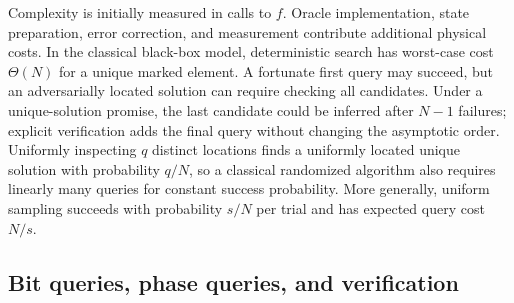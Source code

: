 \documentclass[11pt,oneside,openany]{book}
\theoremstyle{definition}
\begin{document}
Complexity is initially measured in calls to $f$. Oracle implementation, state preparation, error correction, and measurement contribute additional physical costs. In the classical black-box model, deterministic search has worst-case cost $\Theta(N)$ for a unique marked element. A fortunate first query may succeed, but an adversarially located solution can require checking all candidates. Under a unique-solution promise, the last candidate could be inferred after $N-1$ failures; explicit verification adds the final query without changing the asymptotic order. Uniformly inspecting $q$ distinct locations finds a uniformly located unique solution with probability $q/N$, so a classical randomized algorithm also requires linearly many queries for constant success probability. More generally, uniform sampling succeeds with probability $s/N$ per trial and has expected query cost $N/s$.

\subsection{Bit queries, phase queries, and verification}
\end{document}

